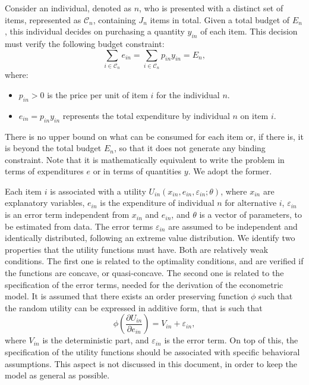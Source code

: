 \documentclass[12pt,a4paper]{article}
\begin{document}
Consider an individual, denoted as $n$, who is presented with a
distinct set of items, represented as $\mathcal{C}_n$, containing
$J_n$ items in total. Given a total budget of $E_n$, this individual
decides on purchasing a quantity $y_{in}$ of each item. This decision
must verify the following budget constraint:
\[
\sum_{i \in \mathcal{C}_n} e_{in} = \sum_{i \in \mathcal{C}_n} p_{in} y_{in} = E_n,
\]
where:
\begin{itemize}
    \item $p_{in} > 0$ is the price per unit of item $i$ for the individual $n$.
    \item $e_{in} = p_{in} y_{in}$ represents the total expenditure by individual $n$ on item $i$.
\end{itemize}
There is no upper bound on what can be consumed for each item or, if there is, it is beyond the total budget $E_n$, so that
it does not generate any binding constraint.
Note that it is mathematically equivalent
to write the problem in terms of expenditures $e$ or in terms of quantities $y$. We adopt the former.


Each item $i$ is associated with a utility $U_{in}(x_{in}, e_{in}, \varepsilon_{in}; \theta)$, where $x_{in}$ are explanatory variables,
$e_{in}$ is the expenditure of individual $n$ for alternative $i$, $\varepsilon_{in}$ is an error term independent from $x_{in}$ and $e_{in}$, and $\theta$ is a vector of parameters, to be estimated from data.
The error terms $\varepsilon_{in}$ are assumed to be independent and identically distributed, following an extreme value distribution.
We identify two
properties that the utility functions must have. Both are relatively
weak conditions. The first one is related to the optimality
conditions, and are verified if the functions are concave, or
quasi-concave. The second one is related to the specification of the
error terms, needed for the derivation of the econometric model.
It is assumed that there exists an order preserving function $\phi$ such that the random utility can be expressed in additive form, that is such that
\begin{equation}
    \label{eq:phi}
\phi\left(\frac{\partial U_{in}}{\partial e_{in}}\right) = V_{in} + \varepsilon_{in},
\end{equation}
where $V_{in}$ is the deterministic part, and $\varepsilon_{in}$ is the error term.
On
top of this, the specification of the utility functions should be
associated with specific behavioral assumptions. This aspect is not discussed in this document, in order to keep the model as general as possible. 
\end{document}
